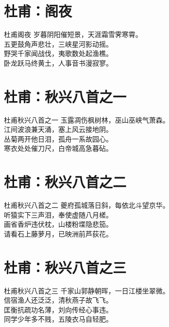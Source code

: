 \documentclass[12pt,oneside,a5paper]{book}
\begin{document}
\chapter{杜甫：阁夜}
\begin{poemzh}{杜甫}{阁夜}
岁暮阴阳催短景，天涯霜雪霁寒霄。\\
五更鼓角声悲壮，三峡星河影动摇。\\
野哭千家闻战伐，夷歌数处起渔樵。\\
卧龙跃马终黄土，人事音书漫寂寥。\\ 
\end{poemzh}

\chapter{杜甫：秋兴八首之一}
\begin{poemzh}{杜甫}{秋兴八首之一}
玉露凋伤枫树林，巫山巫峡气萧森。\\
江间波浪兼天涌，塞上风云接地阴。\\
丛菊两开他日泪，孤舟一系故园心。\\
寒衣处处催刀尺，白帝城高急暮砧。\\  
\end{poemzh}

\chapter{杜甫：秋兴八首之二}
\begin{poemzh}{杜甫}{秋兴八首之二}
夔府孤城落日斜，每依北斗望京华。\\
听猿实下三声泪，奉使虚随八月槎。\\
画省香炉违伏枕，山楼粉堞隐悲笳。\\
请看石上藤萝月，已映洲前芦荻花。\\
\end{poemzh}

\chapter{杜甫：秋兴八首之三}
\begin{poemzh}{杜甫}{秋兴八首之三}
千家山郭静朝晖，一日江楼坐翠微。\\
信宿渔人还泛泛，清秋燕子故飞飞。\\
匡衡抗疏功名薄，刘向传经心事违。\\
同学少年多不贱，五陵衣马自轻肥。\\
\end{poemzh}
\end{document}
